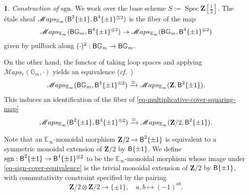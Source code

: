 \documentclass[10pt,english,reqno]{amsart}
\newcommand{\integers}{\mathbf Z}
\newcommand{\SMaps}{\mathscr{M}aps}
\newcommand{\deloop}{\textnormal{\textsf{B}}}
\newcommand{\Spec}{\operatorname{Spec}}
\newcommand{\sgn}{\mathrm{sgn}}
\theoremstyle{definition}
\numberwithin{equation}{section}
\newtheorem{untitledsubsubsection}[subsubsection]{}
\newenvironment{void}
{\begin{untitledsubsubsection}}
{\end{untitledsubsubsection}}
\begin{document}

\begin{void}\emph{Construction of $\sgn$.}
\label{void-sign-cover}
We work over the base scheme $S := \Spec \integers[\frac{1}{2}]$. The \'etale sheaf $\SMaps_{\mathbb E_{\infty}}(\deloop^2\{\pm 1\}, \deloop^4\{\pm 1\}^{\otimes 2})$ is the fiber of the map
\begin{equation}
\label{eq-multiplicative-cover-squaring-map}
\SMaps_{\mathbb E_{\infty}}(\deloop\mathbb G_m, \deloop^4\{\pm 1\}^{\otimes 2}) \rightarrow \SMaps_{\mathbb E_{\infty}}(\deloop\mathbb G_m, \deloop^4\{\pm 1\}^{\otimes 2})
\end{equation}
given by pullback along $(\cdot)^2 : \deloop\mathbb G_m \rightarrow \deloop\mathbb G_m$.

On the other hand, the functor of taking loop spaces and applying $\SMaps_e(\mathbb G_m, \cdot)$ yields an equivalence (\emph{cf.}~\cite[Proposition 4.6.6]{zhao2022metaplectic})
\begin{equation}
\label{eq-multiplicative-cover-parametrization}
\SMaps_{\mathbb E_{\infty}}(\deloop\mathbb G_m, \deloop^4\{\pm 1\}^{\otimes 2})\xrightarrow{\simeq}\SMaps_{\mathbb E_{\infty}}(\integers, \deloop^2\{\pm 1\}).
\end{equation}
This induces an identification of the fiber of \eqref{eq-multiplicative-cover-squaring-map}
\begin{equation}
\label{eq-sign-cover-equivalence}
\SMaps_{\mathbb E_{\infty}}(\deloop^2\{\pm 1\}, \deloop^4\{\pm 1\}^{\otimes 2})\xrightarrow{\simeq} \SMaps_{\mathbb E_{\infty}}(\integers/2, \deloop^2\{\pm 1\}).
\end{equation}

Note that an $\mathbb E_{\infty}$-monoidal morphism $\integers/2 \rightarrow \deloop^2\{\pm 1\}$ is equivalent to a symmetric monoidal extension of $\integers/2$ by $\deloop\{\pm 1\}$. We define $\sgn : \deloop^2\{\pm 1\} \rightarrow \deloop^4\{\pm 1\}^{\otimes 2}$ to be the $\mathbb E_{\infty}$-monoidal morphism whose image under \eqref{eq-sign-cover-equivalence} is the trivial monoidal extension of $\integers/2$ by $\deloop\{\pm 1\}$, with commutativity constraint specified by the pairing
$$
\integers/2 \otimes \integers/2 \rightarrow \{\pm 1\},\quad a, b\mapsto (-1)^{ab}.
$$
\end{void}

\end{document}
